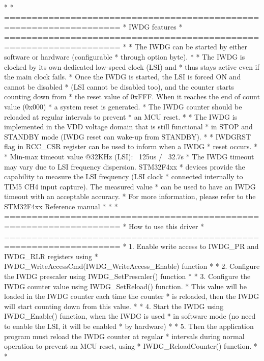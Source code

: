 \begin{DoxyVerb}*  
*          ===================================================================
*                                     IWDG features
*          ===================================================================
*    
*          The IWDG can be started by either software or hardware (configurable
*          through option byte).
*            
*          The IWDG is clocked by its own dedicated low-speed clock (LSI) and
*          thus stays active even if the main clock fails.
*          Once the IWDG is started, the LSI is forced ON and cannot be disabled
*          (LSI cannot be disabled too), and the counter starts counting down from 
*          the reset value of 0xFFF. When it reaches the end of count value (0x000)
*          a system reset is generated.
*          The IWDG counter should be reloaded at regular intervals to prevent
*          an MCU reset.
*                           
*          The IWDG is implemented in the VDD voltage domain that is still functional
*          in STOP and STANDBY mode (IWDG reset can wake-up from STANDBY).          
*            
*          IWDGRST flag in RCC_CSR register can be used to inform when a IWDG
*          reset occurs.
*            
*          Min-max timeout value @32KHz (LSI): ~125us / ~32.7s
*          The IWDG timeout may vary due to LSI frequency dispersion. STM32F4xx
*          devices provide the capability to measure the LSI frequency (LSI clock
*          connected internally to TIM5 CH4 input capture). The measured value
*          can be used to have an IWDG timeout with an acceptable accuracy. 
*          For more information, please refer to the STM32F4xx Reference manual
*          
*                            
*          ===================================================================
*                                 How to use this driver
*          ===================================================================
*          1. Enable write access to IWDG_PR and IWDG_RLR registers using
*             IWDG_WriteAccessCmd(IWDG_WriteAccess_Enable) function
*               
*          2. Configure the IWDG prescaler using IWDG_SetPrescaler() function
*            
*          3. Configure the IWDG counter value using IWDG_SetReload() function.
*             This value will be loaded in the IWDG counter each time the counter
*             is reloaded, then the IWDG will start counting down from this value.
*            
*          4. Start the IWDG using IWDG_Enable() function, when the IWDG is used
*             in software mode (no need to enable the LSI, it will be enabled
*             by hardware)
*             
*          5. Then the application program must reload the IWDG counter at regular
*             intervals during normal operation to prevent an MCU reset, using
*             IWDG_ReloadCounter() function.      
*          
*  \end{DoxyVerb}


